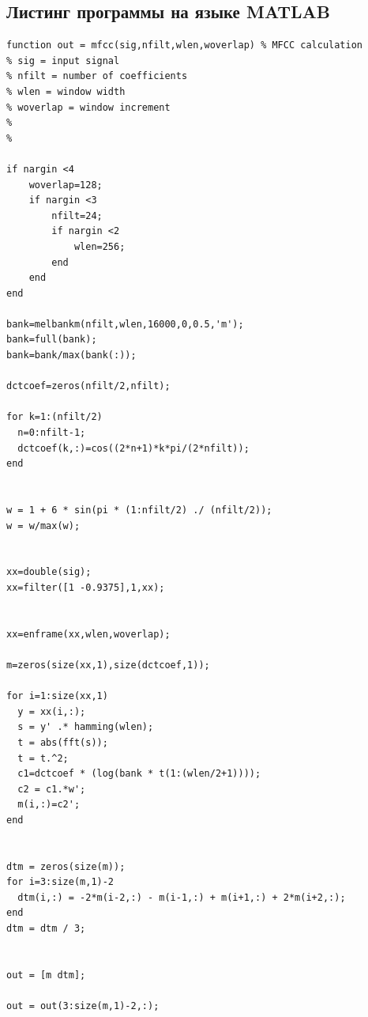 \documentclass[14pt,russian,utf8,nocolumnsxix]{extarticle}
\begin{document}
\pagebreak
\subsection{Листинг программы на языке MATLAB}

\begin{lstlisting}
function out = mfcc(sig,nfilt,wlen,woverlap) % MFCC calculation
% sig = input signal
% nfilt = number of coefficients
% wlen = window width
% woverlap = window increment
%
%

if nargin <4
    woverlap=128;
    if nargin <3
        nfilt=24;
        if nargin <2
            wlen=256;
        end
    end
end

bank=melbankm(nfilt,wlen,16000,0,0.5,'m'); 
bank=full(bank); 
bank=bank/max(bank(:)); 
 
dctcoef=zeros(nfilt/2,nfilt);

for k=1:(nfilt/2)
  n=0:nfilt-1; 
  dctcoef(k,:)=cos((2*n+1)*k*pi/(2*nfilt)); 
end 
 
 
w = 1 + 6 * sin(pi * (1:nfilt/2) ./ (nfilt/2)); 
w = w/max(w); 
 

xx=double(sig); 
xx=filter([1 -0.9375],1,xx); 
 

xx=enframe(xx,wlen,woverlap); 
 
m=zeros(size(xx,1),size(dctcoef,1));

for i=1:size(xx,1) 
  y = xx(i,:); 
  s = y' .* hamming(wlen); 
  t = abs(fft(s)); 
  t = t.^2; 
  c1=dctcoef * (log(bank * t(1:(wlen/2+1)))); 
  c2 = c1.*w'; 
  m(i,:)=c2'; 
end 
 

dtm = zeros(size(m)); 
for i=3:size(m,1)-2 
  dtm(i,:) = -2*m(i-2,:) - m(i-1,:) + m(i+1,:) + 2*m(i+2,:); 
end 
dtm = dtm / 3; 
 
 
out = [m dtm]; 

out = out(3:size(m,1)-2,:); 

\end{lstlisting}
\end{document}
